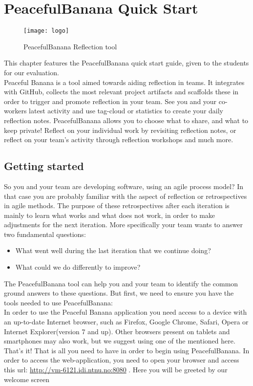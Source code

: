 \newpage
\thispagestyle{empty}
\mbox{}
\chapter{PeacefulBanana Quick Start}

\begin{figure}[h!]
\label{logo}
\centering
	\texttt{[image: logo]}
\caption{PeacefulBanana Reflection tool}
\end{figure}

This chapter features the PeacefulBanana quick start guide, given to the students for our evaluation. \\
Peaceful Banana is a tool aimed towards aiding reflection in teams. It integrates with GitHub, collects the most relevant project artifacts and scaffolds these in order to trigger and promote reflection in your team.
See you and your co-workers latest activity and use tag-cloud or statistics to create your daily reflection notes. PeacefulBanana allows you to choose what to share, and what to keep private! Reflect on your individual work by revisiting reflection notes, or reflect on your team's activity through reflection workshops and much more. 
\pagebreak

\section{Getting started}
So you and your team are developing software, using an agile process model? In that case you are probably familiar with the aspect of reflection or retrospectives in agile methods. The purpose of these retrospectives after each iteration is mainly to learn what works and what does not work, in order to make adjustments for the next iteration. More specifically your team wants to answer two fundamental questions:
\begin{itemize}
\item What went well during the last iteration that we continue doing? 
\item What could we do differently to improve?
\end{itemize}

The PeacefulBanana tool can help you and your team to identify the common ground answers to these questions. But first, we need to ensure you have the tools needed to use PeacefulBanana: \\
In order to use the Peaceful Banana application you need access to a device with an up-to-date Internet browser, such as Firefox, Google Chrome, Safari, Opera or Internet Explorer(version 7 and up). Other browsers present on tablets and smartphones may also work, but we suggest using one of the mentioned here. \\
That's it! That is all you need to have in order to begin using PeacefulBanana. 
In order to access the web-application, you need to open your browser and access this url: \url{http://vm-6121.idi.ntnu.no:8080} . Here you will be greeted by our welcome screen\\

